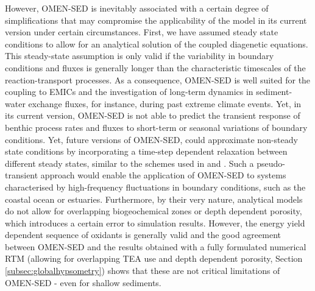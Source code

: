 \documentclass[gmd, manuscript]{copernicus}
\begin{document}
However, OMEN-SED is inevitably associated with a certain degree of simplifications that may compromise the applicability of the model in its current version under certain circumstances. 
First, we have assumed steady state conditions to allow for an analytical solution of the coupled diagenetic equations. This steady-state assumption is only valid if the variability in boundary conditions and fluxes is generally longer 
than the characteristic timescales of the reaction-transport processes. As a consequence, OMEN-SED is well suited for the coupling to EMICs and the investigation of long-term dynamics in sediment-water exchange fluxes, for instance, 
during past extreme climate events. Yet, in its current version, OMEN-SED is not able to predict the transient response of benthic process rates and fluxes to short-term or seasonal variations of boundary conditions. Yet, future versions of 
OMEN-SED, could approximate non-steady state conditions by incorporating a time-step dependent relaxation between different steady states, similar to the schemes used in \citet{ruardij_benthic_1995} and \citet{arndt_model_2007}. 
Such a pseudo-transient approach would enable the application of OMEN-SED to systems characterised by high-frequency fluctuations in boundary conditions, such as the coastal ocean or estuaries. 
Furthermore, by their very nature, analytical models do not allow for overlapping biogeochemical zones or depth dependent porosity, which introduces a certain error to simulation results. However, the energy yield dependent sequence of oxidants is 
generally valid \citep[e.g.][]{hensen_benthic_2006} and the good agreement between OMEN-SED and the results obtained with a fully formulated numerical RTM (allowing for overlapping TEA use and depth dependent porosity, Section \ref{subsec:globalhypsometry}) 
shows that these are not critical limitations of OMEN-SED - even for shallow sediments. 
\end{document}
